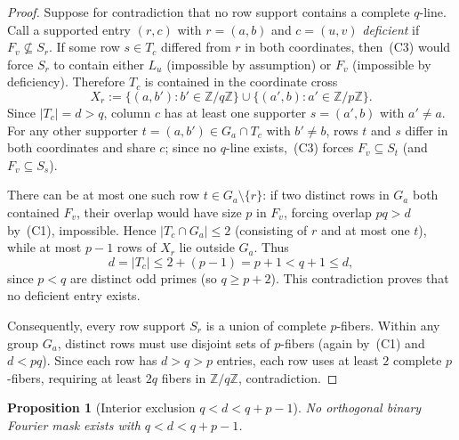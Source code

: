 \documentclass[11pt,reqno]{amsart}
\numberwithin{equation}{section}
\newtheorem{proposition}[theorem]{Proposition}
\theoremstyle{definition}
\theoremstyle{remark}
\newcommand{\Z}{\mathbb{Z}}
\begin{document}
\begin{proof}
Suppose for contradiction that no row support contains a complete $q$-line. Call a supported entry $(r,c)$ with $r=(a,b)$ and $c=(u,v)$ \emph{deficient} if $F_v\not\subseteq S_r$. If some row $s\in T_c$ differed from $r$ in both coordinates, then~(C3) would force $S_r$ to contain either $L_u$ (impossible by assumption) or $F_v$ (impossible by deficiency). Therefore $T_c$ is contained in the coordinate cross
\[
X_r := \{(a,b') : b'\in\Z/q\Z\} \cup \{(a',b) : a'\in\Z/p\Z\}.
\]
Since $|T_c|=d>q$, column $c$ has at least one supporter $s=(a',b)$ with $a'\neq a$. For any other supporter $t=(a,b')\in G_a\cap T_c$ with $b'\neq b$, rows $t$ and $s$ differ in both coordinates and share $c$; since no $q$-line exists,~(C3) forces $F_v\subseteq S_t$ (and $F_v\subseteq S_s$).

There can be at most one such row $t\in G_a\setminus\{r\}$: if two distinct rows in $G_a$ both contained $F_v$, their overlap would have size $p$ in $F_v$, forcing overlap $pq>d$ by~(C1), impossible. Hence $|T_c\cap G_a|\le 2$ (consisting of $r$ and at most one $t$), while at most $p-1$ rows of $X_r$ lie outside $G_a$. Thus
\[
d = |T_c| \le 2 + (p-1) = p+1 < q+1 \le d,
\]
since $p<q$ are distinct odd primes (so $q\ge p+2$). This contradiction proves that no deficient entry exists.

Consequently, every row support $S_r$ is a union of complete $p$-fibers. Within any group $G_a$, distinct rows must use disjoint sets of $p$-fibers (again by~(C1) and $d<pq$). Since each row has $d>q>p$ entries, each row uses at least $2$ complete $p$-fibers, requiring at least $2q$ fibers in $\Z/q\Z$, contradiction.
\end{proof}

\begin{proposition}[Interior exclusion $q<d<q+p-1$]
\label{prop:interior}
No orthogonal binary Fourier mask exists with $q<d<q+p-1$.
\end{proposition}
\end{document}

